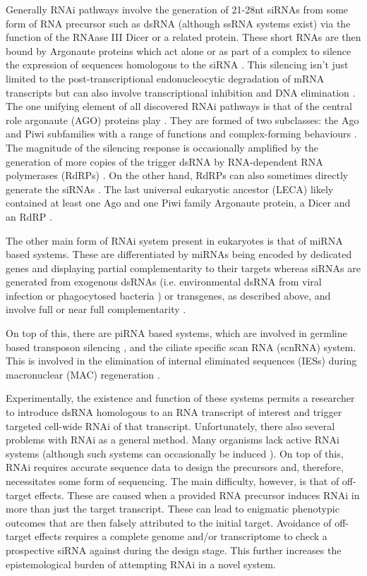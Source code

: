 Generally RNAi pathways involve the generation of 21-28nt siRNAs
from some form of RNA precursor such as dsRNA (although ssRNA systems exist)
via the function of the RNAase III Dicer \citep{Bernstein2001} or a related protein. 
These short RNAs are then bound by Argonaute proteins which act alone or as part
of a complex to silence the expression of sequences homologous to the siRNA \citep{Ketting2011}.
This silencing isn't just limited to the post-transcriptional endonucleocytic degradation of 
mRNA transcripts but can also involve transcriptional inhibition and
DNA elimination \citep{Marker2014}.
The one unifying element of all discovered RNAi pathways is that
of the central role argonaute (AGO) proteins play \citep{Ketting2011}.
They are formed of two subclasses: the Ago and Piwi subfamilies \citep{Peters2007}
with a range of functions and complex-forming behaviours
\citep{Ender2010}.
The magnitude of the silencing response is occasionally amplified by the generation
of more copies of the trigger dsRNA by RNA-dependent RNA polymerases (RdRPs) \citep{Arp2007}.
On the other hand, RdRPs can also sometimes directly generate the siRNAs \citep{Aoki2007,Ketting2011}.
The last universal eukaryotic ancestor (LECA) likely contained 
at least one Ago and one Piwi family Argonaute protein, a Dicer and an RdRP \citep{Cerutti2006}.

The other main form of RNAi system present in eukaryotes is that of 
miRNA based systems.  These are differentiated
by miRNAs being encoded by dedicated genes and displaying partial
complementarity to their targets whereas siRNAs are generated from exogenous
dsRNAs (i.e. environmental dsRNA from viral infection or phagocytosed bacteria \citep{Whangbo2008})
or transgenes, as described above, and involve full or near full complementarity \citep{Shabalina2008}.

On top of this, there are piRNA based systems, which are involved in germline based transposon 
silencing \citep{Iwasaki2015}, and the ciliate specific scan RNA (scnRNA) system.
This is involved in the elimination of internal eliminated sequences (IESs) during
macronuclear (MAC) regeneration \citep{Mochizuki2004,Kiefer2013}.


Experimentally, the existence and function of these systems
permits a researcher to introduce dsRNA homologous to an RNA transcript of interest
and trigger targeted cell-wide RNAi of that transcript.
Unfortunately, there also several problems with RNAi as a general method.
Many organisms lack active RNAi systems (although such systems can occasionally
be induced \citep{Alibu2005}).
On top of this, RNAi requires accurate sequence data to design the precursors and,
therefore, necessitates some form of sequencing. 
The main difficulty, however, is that of off-target effects.
These are caused when a provided RNA precursor induces RNAi
in more than just the target transcript.  These
can lead to enigmatic phenotypic outcomes that 
are then falsely attributed to the initial target.
Avoidance of off-target effects 
requires a complete genome and/or transcriptome
to check a prospective siRNA against during the design
stage.  This further increases the epistemological
burden of attempting RNAi in a novel system.

